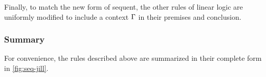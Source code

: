 Finally, 
to match the new form of sequent,
the other rules of linear logic are uniformly modified to include a context $\Gamma$ in their premises and conclusion.


\subsubsection{Summary}\label{sec:summary-linear-logic}

For convenience, the rules described above are summarized in their complete form in \cref{fig:seq-jill}.%




